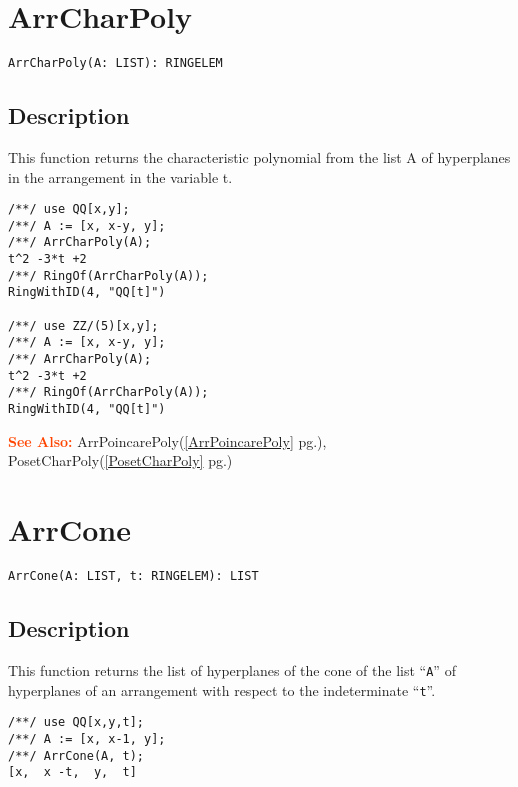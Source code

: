 \documentclass[a4paper]{mybook}
\newenvironment{command}{}{} %
\newcommand\SeeAlso{\par\textcolor{OrangeRed}{\textbf{\large See Also: }}}
\begin{document}
\section{ArrCharPoly}
\label{ArrCharPoly}
\begin{command} %


\begin{Verbatim}[label=syntax, rulecolor=\color{MidnightBlue},
frame=single]
ArrCharPoly(A: LIST): RINGELEM
\end{Verbatim}


\subsection*{Description}

This function returns the characteristic polynomial from the list A of hyperplanes in the arrangement in the variable t.
\begin{Verbatim}[label=example, rulecolor=\color{PineGreen}, frame=single]
/**/ use QQ[x,y];	
/**/ A := [x, x-y, y];
/**/ ArrCharPoly(A);
t^2 -3*t +2
/**/ RingOf(ArrCharPoly(A));
RingWithID(4, "QQ[t]")

/**/ use ZZ/(5)[x,y];	
/**/ A := [x, x-y, y];
/**/ ArrCharPoly(A);
t^2 -3*t +2
/**/ RingOf(ArrCharPoly(A));
RingWithID(4, "QQ[t]")
\end{Verbatim}


\SeeAlso %
  ArrPoincarePoly(\ref{ArrPoincarePoly} pg.\pageref{ArrPoincarePoly}), 
    PosetCharPoly(\ref{PosetCharPoly} pg.\pageref{PosetCharPoly})
\end{command} %

\section{ArrCone}
\label{ArrCone}
\begin{command} %


\begin{Verbatim}[label=syntax, rulecolor=\color{MidnightBlue},
frame=single]
ArrCone(A: LIST, t: RINGELEM): LIST 
\end{Verbatim}


\subsection*{Description}

This function returns the list of hyperplanes of the cone of the list
``\verb&A&'' of hyperplanes of an arrangement with respect to the
indeterminate ``\verb&t&''.
\begin{Verbatim}[label=example, rulecolor=\color{PineGreen}, frame=single]
/**/ use QQ[x,y,t];	
/**/ A := [x, x-1, y];
/**/ ArrCone(A, t);
[x,  x -t,  y,  t]
\end{Verbatim}


\end{command} %
\end{document}
